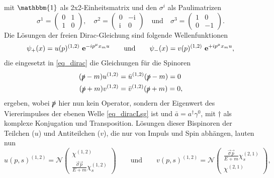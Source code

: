 \documentclass[11pt,a4paper,twoside]{report}
\begin{document}
mit $\mathbbm{1}$ als 2x2-Einheitsmatrix und den $\sigma^i$ als Paulimatrizen
\begin{equation*}
 \sigma^1 = \begin{pmatrix}
             0 & 1\\
             1 & 0
            \end{pmatrix},\quad \sigma^2 = \begin{pmatrix}
					    0 & -\text{i}\\
					    \text{i} & 0
					    \end{pmatrix}\quad \text{und} \quad\sigma^3 = \begin{pmatrix}
									    1 & 0\\
									    0 & -1
									    \end{pmatrix}.									    
\end{equation*}
Die Lösungen der freien Dirac-Gleichung sind folgende Wellenfunktionen
\begin{align}
 \psi_+(x) = u(p)^{(1,2)} \ \mathbf{e}^{-ip^\mu x_mu}\qquad\text{und}\qquad \psi_-(x) = v(p)^{(1,2)} \ \mathbf{e}^{+ip^\mu x_mu},
 \label{eq_diracLsg}
\end{align}
die eingesetzt in \eqref{eq_dirac} die Gleichungen für die Spinoren
\begin{align}
 (\slashed{p} - m )u^{(1,2)} &= \bar u^{(1,2)}(\slashed{p}-m) = 0 \\
 (\slashed{p} + m )v^{(1,2)} &= \bar v^{(1,2)}(\slashed{p}+m) = 0,
\end{align}
ergeben, wobei $\slashed{p}$ hier nun kein Operator, sondern der Eigenwert des Viererimpulses der ebenen Welle \eqref{eq_diracLsg} ist und $\bar a = a^\dagger \gamma^0$,
mit $\dagger$ als komplexe Konjugation und Transposition. Lösungen dieser Bispinoren der Teilchen ($u$) und Antiteilchen ($v$), die nur von Impuls und Spin abhängen,
lauten nun
\begin{equation}
 u(p,s)^{(1,2)} = \mathcal{N} \begin{pmatrix}
                          \chi^{(1,2)}\\
                          \frac{\vec \sigma \vec p}{E+m} \chi_s^{(1,2)}
                         \end{pmatrix} \qquad \text{und}\qquad v(p,s)^{(1,2)} = \mathcal{N} \begin{pmatrix}
                          \frac{\vec \sigma \vec p}{E+m} \chi_s^{(2,1)}\\
                          \chi^{(2,1)}                          
                         \end{pmatrix},
\end{equation}
\end{document}
